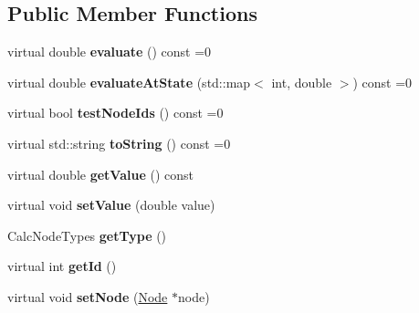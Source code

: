 \subsection*{Public Member Functions}
\begin{DoxyCompactItemize}
\item 
virtual double {\bfseries evaluate} () const  =0\hypertarget{classCalculationNode_ac0b4e69fc8bfc99b0ad178b4eeb15883}{}\label{classCalculationNode_ac0b4e69fc8bfc99b0ad178b4eeb15883}

\item 
virtual double {\bfseries evaluate\+At\+State} (std\+::map$<$ int, double $>$) const  =0\hypertarget{classCalculationNode_a15efb576650532bbf21a11f1f9bcb1b2}{}\label{classCalculationNode_a15efb576650532bbf21a11f1f9bcb1b2}

\item 
virtual bool {\bfseries test\+Node\+Ids} () const  =0\hypertarget{classCalculationNode_a4089a2510d7c345a9632843a3fed4f0e}{}\label{classCalculationNode_a4089a2510d7c345a9632843a3fed4f0e}

\item 
virtual std\+::string {\bfseries to\+String} () const  =0\hypertarget{classCalculationNode_aeee8e0d2c7d5c97e0d6801e9644cd686}{}\label{classCalculationNode_aeee8e0d2c7d5c97e0d6801e9644cd686}

\item 
virtual double {\bfseries get\+Value} () const \hypertarget{classCalculationNode_af23ecff57877120eea2f402bb8432549}{}\label{classCalculationNode_af23ecff57877120eea2f402bb8432549}

\item 
virtual void {\bfseries set\+Value} (double value)\hypertarget{classCalculationNode_a63783e44f06e8b665f2f6851616b2965}{}\label{classCalculationNode_a63783e44f06e8b665f2f6851616b2965}

\item 
Calc\+Node\+Types {\bfseries get\+Type} ()\hypertarget{classCalculationNode_ad5df05ec0725d5c4c44b6eecc158a83b}{}\label{classCalculationNode_ad5df05ec0725d5c4c44b6eecc158a83b}

\item 
virtual int {\bfseries get\+Id} ()\hypertarget{classCalculationNode_a57d514437cfc918ddb298d482358c82d}{}\label{classCalculationNode_a57d514437cfc918ddb298d482358c82d}

\item 
virtual void {\bfseries set\+Node} (\hyperlink{classNode}{Node} $\ast$node)\hypertarget{classCalculationNode_a4097a8577ad76d94c32250d76988353c}{}\label{classCalculationNode_a4097a8577ad76d94c32250d76988353c}

\end{DoxyCompactItemize}
